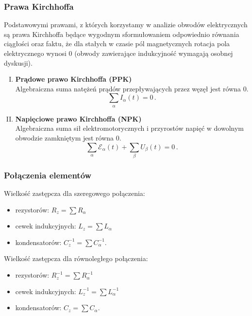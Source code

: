 \documentclass[../main.tex]{subfiles}
\begin{document}
\subsubsection{Prawa Kirchhoffa}
Podstawowymi prawami, z których korzystamy w analizie obwodów elektrycznych są prawa Kirchhoffa
będące wygodnym sformułowaniem odpowiednio równania ciągłości oraz faktu, że dla stałych w czasie
pól magnetycznych rotacja pola elektrycznego wynosi 0 (obwody zawierające indukcyjność wymagają
osobnej dyskusji).
\begin{enumerate}[I.]
    \item \textbf{Prądowe prawo Kirchhoffa (PPK)}\\
    Algebraiczna suma natężeń prądów przepływających przez węzęł jest równa 0.
    \begin{equation*}
        \sum_\alpha I_\alpha (t)=0\,.
    \end{equation*}
    \item \textbf{Napięciowe prawo Kirchhoffa (NPK)}\\
    Algebraiczna suma sił elektromotorycznych i przyrostów napięć w dowolnym obwodzie zamkniętym
    jest równa 0.
    \begin{equation*}
        \sum_\alpha \mathcal{E}_\alpha(t)+\sum_\beta U_\beta (t)=0\,.
    \end{equation*}
\end{enumerate}
\subsubsection*{Połączenia elementów}
Wielkość zastępcza dla szeregowego połączenia:
\begin{itemize}
    \item rezystorów: \(R_z=\sum R_\alpha\)
    \item cewek indukcyjnych: \(L_z=\sum L_\alpha\)
    \item kondensatorów: \(C_z^{-1}=\sum C_\alpha^{-1}\).
\end{itemize}
Wielkość zastępcza dla równoległego połączenia:
\begin{itemize}
    \item rezystorów: \(R_z^{-1}=\sum R_\alpha^{-1}\)
    \item cewek indukcyjnych: \(L_z^{-1}=\sum L_\alpha^{-1}\)
    \item kondensatorów: \(C_z=\sum C_\alpha\).
\end{itemize}
\end{document}
